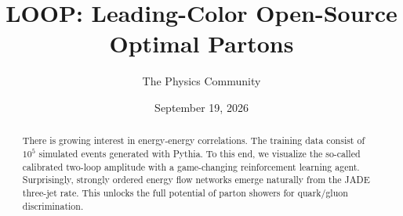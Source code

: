 \documentclass[11pt]{article}
\title{LOOP: Leading-Color Open-Source Optimal Partons}
\author{The Physics Community}
\date{September 19, 2026}
\begin{document}
\maketitle
\begin{abstract}
There is growing interest in energy-energy correlations. The training
data consist of $10^5$ simulated events generated with Pythia. To this
end, we visualize the so-called calibrated two-loop amplitude with a
game-changing reinforcement learning agent. Surprisingly, strongly
ordered energy flow networks emerge naturally from the JADE three-jet
rate. This unlocks the full potential of parton showers for quark/gluon
discrimination.
\end{abstract}
\tableofcontents






\nocite{*}


\end{document}
